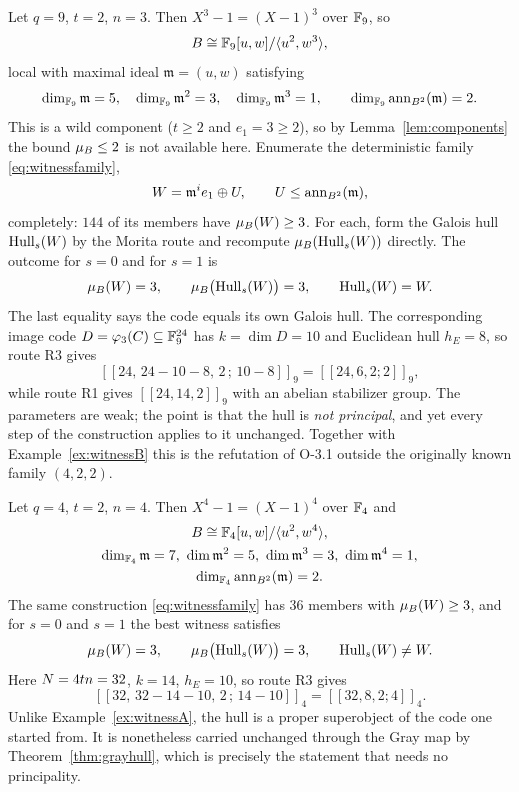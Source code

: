 \begin{example}\label{ex:witnessA}
Let $q=9$, $t=2$, $n=3$. Then $X^3-1=(X-1)^3$ over $\mathbb F_9$, so
\[
  B\cong\mathbb F_9[u,w]/\langle u^2,w^3\rangle ,
\]
local with maximal ideal $\mathfrak m=(u,w)$ satisfying
\[
  \dim_{\mathbb F_9}\mathfrak m=5,\quad \dim_{\mathbb F_9}\mathfrak m^2=3,\quad
  \dim_{\mathbb F_9}\mathfrak m^3=1,\qquad \dim_{\mathbb F_9}\operatorname{ann}_{B^2}(\mathfrak m)=2 .
\]
This is a wild component ($t\ge2$ and $e_1=3\ge2$), so by
Lemma~\ref{lem:components} the bound $\mu_{B}\le2$ is not available here.
Enumerate the deterministic family \eqref{eq:witnessfamily},
\[
  W=\mathfrak m^ie_1\oplus U,\qquad U\le\operatorname{ann}_{B^2}(\mathfrak m),
\]
completely: $144$ of its members have $\mu_{B}(W)\ge3$. For each, form the
Galois hull $\operatorname{Hull}_s(W)$ by the Morita route and recompute
$\mu_{B}(\operatorname{Hull}_s(W))$ directly. The outcome for $s=0$ and for $s=1$ is
\[
  \mu_{B}(W)=3,\qquad \mu_{B}\bigl(\operatorname{Hull}_s(W)\bigr)=3,\qquad
  \operatorname{Hull}_s(W)=W .
\]
The last equality says the code equals its own Galois hull. The corresponding
image code $D=\varphi_3(C)\subseteq\mathbb F_9^{24}$ has $k=\dim D=10$ and Euclidean
hull $h_E=8$, so route R3 gives
\[
  [[24,\,24-10-8,\,2\,;\,10-8]]_9=[[24,6,2;2]]_9 ,
\]
while route R1 gives $[[24,14,2]]_9$ with an abelian stabilizer group. The
parameters are weak; the point is that the hull is \emph{not principal}, and
yet every step of the construction applies to it unchanged. Together with
Example~\ref{ex:witnessB} this is the refutation of O-3.1 outside the
originally known family $(4,2,2)$.
\end{example}

\begin{example}\label{ex:witnessB}
Let $q=4$, $t=2$, $n=4$. Then $X^4-1=(X-1)^4$ over $\mathbb F_4$ and
\[
  \begin{gathered}
    B\cong\mathbb F_4[u,w]/\langle u^2,w^4\rangle,\\
    \dim_{\mathbb F_4}\mathfrak m=7,\ \dim\mathfrak m^2=5,\
      \dim\mathfrak m^3=3,\ \dim\mathfrak m^4=1,\\
    \dim_{\mathbb F_4}\operatorname{ann}_{B^2}(\mathfrak m)=2 .
  \end{gathered}
\]
The same construction \eqref{eq:witnessfamily} has $36$ members with
$\mu_{B}(W)\ge3$, and for $s=0$ and $s=1$ the best witness satisfies
\[
  \mu_{B}(W)=3,\qquad \mu_{B}\bigl(\operatorname{Hull}_s(W)\bigr)=3,\qquad
  \operatorname{Hull}_s(W)\ne W .
\]
Here $N=4tn=32$, $k=14$, $h_E=10$, so route R3 gives
\[
  [[32,\,32-14-10,\,2\,;\,14-10]]_4=[[32,8,2;4]]_4 .
\]
Unlike Example~\ref{ex:witnessA}, the hull is a proper superobject of the
code one started from. It is nonetheless carried unchanged through the Gray
map by Theorem~\ref{thm:grayhull}, which is precisely the statement that needs
no principality.
\end{example}
